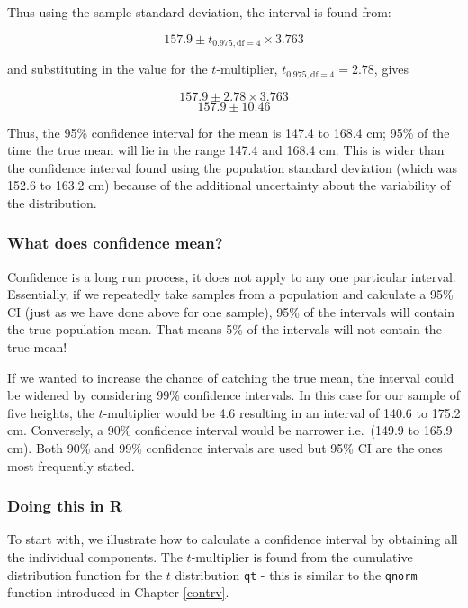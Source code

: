 \documentclass[
  oneside]{krantz}
\begin{document}
Thus using the sample standard deviation, the interval is found from:

\[157.9 \pm t_{0.975, \textrm{df}=4} \times 3.763\]

and substituting in the value for the \(t\)-multiplier, \(t_{0.975, \textrm{df}=4} = 2.78\), gives

\[157.9 \pm 2.78 \times 3.763\]
\[157.9 \pm 10.46\]

Thus, the 95\% confidence interval for the mean is 147.4 to 168.4 cm; 95\% of the time the true mean will lie in the range 147.4 and 168.4 cm. This is wider than the confidence interval found using the population standard deviation (which was 152.6 to 163.2 cm) because of the additional uncertainty about the variability of the distribution.

\hypertarget{what-does-confidence-mean}{%
\subsubsection{What does confidence mean?}\label{what-does-confidence-mean}}

Confidence is a long run process, it does not apply to any one particular interval. Essentially, if we repeatedly take samples from a population and calculate a 95\% CI (just as we have done above for one sample), 95\% of the intervals will contain the true population mean. That means 5\% of the intervals will not contain the true mean!

If we wanted to increase the chance of catching the true mean, the interval could be widened by considering 99\% confidence intervals. In this case for our sample of five heights, the \(t\)-multiplier would be 4.6 resulting in an interval of 140.6 to 175.2 cm. Conversely, a 90\% confidence interval would be narrower i.e.~(149.9 to 165.9 cm). Both 90\% and 99\% confidence intervals are used but 95\% CI are the ones most frequently stated.

\hypertarget{doing-this-in-r-7}{%
\subsubsection{Doing this in R}\label{doing-this-in-r-7}}

To start with, we illustrate how to calculate a confidence interval by obtaining all the individual components. The \(t\)-multiplier is found from the cumulative distribution function for the \(t\) distribution \texttt{qt} - this is similar to the \texttt{qnorm} function introduced in Chapter \ref{contrv}.
\end{document}
